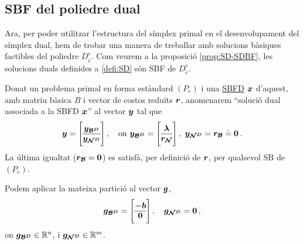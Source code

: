 \subsection{SBF del poliedre dual}
Ara, per poder utilitzar l'estructura del símplex primal en el desenvolupament del símplex dual, hem de trobar una manera de treballar amb solucions bàsiques factibles del poliedre $D^e_{\tilde{e}}$. Com veurem a la proposició \ref{prop:SD-SDBF}, les solucions duals definides a \ref{defi:SD} són SBF de $D^e_{\tilde{e}}$. 

\begin{defi}\label{defi:SD}
	Donat un problema primal en forma estàndard $(P_e)$ i una \hyperref[defi:SBFD]{SBFD} $\boldsymbol{x}$ d'aquest, amb matriu bàsica $B$ i vector de costos reduïts $\boldsymbol{r}$, anomenarem ``solució dual associada a la SBFD $\boldsymbol{x}$'' al vector $\boldsymbol{y}$ tal que
	\[
		\vb{y} = 
		\left[\begin{array}{@{}c@{}}
		\vb{y_{\B^D}}\\
		\hline
		\vb{y_{\N^D}}
		\end{array}\right],\quad\text{on }
		\vb{y_{\B^D}}=
		\left[\begin{array}{@{}c@{}}
			\vb{\lambda}\\
			\hline
			\vb{r_\N}
		\end{array}\right],\ 
		\vb{y_{\N^D}} = \vb{r_\B} \doteq \vb{0}\,.	
	\]
	La última igualtat ($\boldsymbol{r_{\mathcal{B}}}=\boldsymbol{0}$) es satisfà, per definició de $\boldsymbol{r}$, per qualsevol SB de $(P_e)$.
\end{defi}


Podem aplicar la mateixa partició al vector $\boldsymbol{g}$,
\[
	\vb{g_{\B^D}} = 
	\left[\begin{array}{@{}c@{}}
		\vb{-b}\\
		\hline
		\vb{0}\\
	\end{array}\right], \quad
	\vb{g_{\N^D}} = \vb{0}\,,
\]
on $\boldsymbol{g_{\mathcal{B}^D}}\in \mathbb{R}^{n}$, i $\boldsymbol{g_{\mathcal{N}^D}}\in \mathbb{R}^m$.

